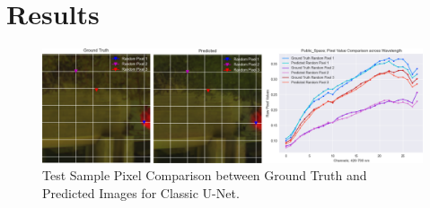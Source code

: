 \documentclass{article}
\begin{document}
\section{Results}

\begin{figure}[!h]
    \centering
\includegraphics[width=\textwidth]{figs/ClassicUnet/pixel_comparison/PublicSpaceConsolidated.png}
    \caption{Test Sample Pixel Comparison between Ground Truth and Predicted Images for Classic U-Net.}
    \label{fig:PublicSpacePC}
\end{figure}

\end{document}
